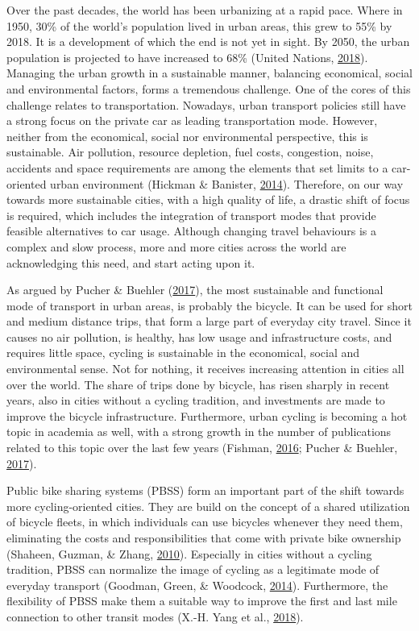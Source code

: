 \documentclass[12pt,oneside]{reedthesis}
\begin{document}
Over the past decades, the world has been urbanizing at a rapid pace.
Where in 1950, 30\% of the world's population lived in urban areas, this
grew to 55\% by 2018. It is a development of which the end is not yet in
sight. By 2050, the urban population is projected to have increased to
68\% (United Nations, \protect\hyperlink{ref-un2018}{2018}). Managing
the urban growth in a sustainable manner, balancing economical, social
and environmental factors, forms a tremendous challenge. One of the
cores of this challenge relates to transportation. Nowadays, urban
transport policies still have a strong focus on the private car as
leading transportation mode. However, neither from the economical,
social nor environmental perspective, this is sustainable. Air
pollution, resource depletion, fuel costs, congestion, noise, accidents
and space requirements are among the elements that set limits to a
car-oriented urban environment (Hickman \& Banister,
\protect\hyperlink{ref-hickman2014}{2014}). Therefore, on our way
towards more sustainable cities, with a high quality of life, a drastic
shift of focus is required, which includes the integration of transport
modes that provide feasible alternatives to car usage. Although changing
travel behaviours is a complex and slow process, more and more cities
across the world are acknowledging this need, and start acting upon it.

As argued by Pucher \& Buehler
(\protect\hyperlink{ref-pucher2017}{2017}), the most sustainable and
functional mode of transport in urban areas, is probably the bicycle. It
can be used for short and medium distance trips, that form a large part
of everyday city travel. Since it causes no air pollution, is healthy,
has low usage and infrastructure costs, and requires little space,
cycling is sustainable in the economical, social and environmental
sense. Not for nothing, it receives increasing attention in cities all
over the world. The share of trips done by bicycle, has risen sharply in
recent years, also in cities without a cycling tradition, and
investments are made to improve the bicycle infrastructure. Furthermore,
urban cycling is becoming a hot topic in academia as well, with a strong
growth in the number of publications related to this topic over the last
few years (Fishman, \protect\hyperlink{ref-fishman2016}{2016}; Pucher \&
Buehler, \protect\hyperlink{ref-pucher2017}{2017}).

Public bike sharing systems (PBSS) form an important part of the shift
towards more cycling-oriented cities. They are build on the concept of a
shared utilization of bicycle fleets, in which individuals can use
bicycles whenever they need them, eliminating the costs and
responsibilities that come with private bike ownership (Shaheen, Guzman,
\& Zhang, \protect\hyperlink{ref-shaheen2010}{2010}). Especially in
cities without a cycling tradition, PBSS can normalize the image of
cycling as a legitimate mode of everyday transport (Goodman, Green, \&
Woodcock, \protect\hyperlink{ref-goodman2014}{2014}). Furthermore, the
flexibility of PBSS make them a suitable way to improve the first and
last mile connection to other transit modes (X.-H. Yang et al.,
\protect\hyperlink{ref-yang2018}{2018}).
\end{document}
